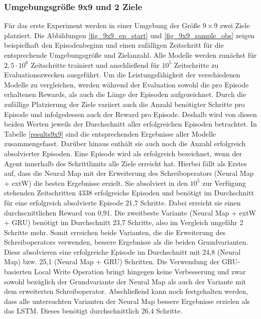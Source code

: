 \subsubsection{Umgebungsgröße 9x9 und 2 Ziele}
Für das erste Experiment werden in einer Umgebung der Größe $9 \times 9$ zwei Ziele platziert. Die Abbildungen \ref{fig_9x9_ep_start} und \ref{fig_9x9_sample_obs} zeigen beispielhaft den Episodenbeginn und einen zufälligen Zeitschritt für die entsprechende Umgebungsgröße und Zielanzahl. Alle Modelle werden zunächst für $2,5\cdot10^6$ Zeitschritte trainiert und anschließend für $10^5$ Zeitschritte zu Evaluationszwecken ausgeführt. Um die Leistungsfähigkeit der verschiedenen Modelle zu vergleichen, werden während der Evaluation sowohl die pro Episode erhaltenen Rewards, als auch die Länge der Episoden aufgezeichnet. Durch die zufällige Platzierung der Ziele variiert auch die Anzahl benötigter Schritte pro Episode und infolgedessen auch der Reward pro Episode. Deshalb wird von diesen beiden Werten jeweils der Durchschnitt aller erfolgreichen Episoden betrachtet. In Tabelle \ref{results9x9} sind die entsprechenden Ergebnisse aller Modelle zusammengefasst. Darüber hinaus enthält sie auch noch die Anzahl erfolgreich absolvierter Episoden. Eine Episode wird als erfolgreich bezeichnet, wenn der Agent innerhalb des Schrittlimits alle Ziele erreicht hat. Hierbei fällt als Erstes auf, dass die Neural Map mit der Erweiterung des Schreiboperators (Neural Map + extW) die besten Ergebnisse erzielt. Sie absolviert in den $10^5$ zur Verfügung stehenden Zeitschritten 4338 erfolgreiche Episoden und benötigt im Durchschnitt für eine erfolgreich absolvierte Episode 21,7 Schritte. Dabei erreicht sie einen durchscnittlichen Reward von 0,91. Die zweitbeste Variante (Neural Map + extW + GRU) benötigt im Durchschnitt 23,7 Schritte, also im Vergleich ungefähr 2 Schritte mehr. Somit erreichen beide Varianten, die die Erweiterung des Schreiboperators verwenden, bessere Ergebnisse als die beiden Grundvarianten. Diese absolvieren eine erfolgreiche Episode im Durchschnitt mit 24,8 (Neural Map) bzw. 25,1 (Neural Map + GRU) Schritten. Die Verwendung der GRU-basierten Local Write Operation bringt hingegen keine Verbesserung und zwar sowohl bezüglich der Grundvariante der Neural Map als auch der Variante mit dem erweiterten Schreiboperator. Abschließend kann noch festgehalten werden, dass alle untersuchten Varianten der Neural Map bessere Ergebnisse erzielen als das LSTM. Dieses benötigt durchschnittlich 26,4 Schritte.


